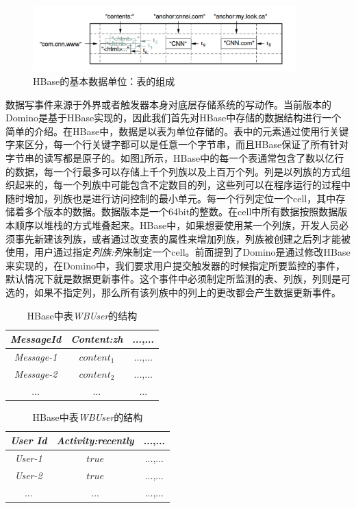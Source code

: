 \begin{figure}[h!]
\centering
\includegraphics[width=4in]{../figures/bigtable.pdf}
\caption{HBase的基本数据单位：表的组成}
\label{fig:hbase}
\end{figure}

数据写事件来源于外界或者触发器本身对底层存储系统的写动作。当前版本的Domino是基于HBase实现的，因此我们首先对HBase中存储的数据结构进行一个简单的介绍。在HBase\cite{chang2008bigtable}中，数据是以表为单位存储的。表中的元素通过使用行关键字来区分，每一个行关键字都可以是任意一个字节串，而且HBase保证了所有针对字节串的读写都是原子的。如图\ref{fig:hbase}所示，HBase中的每一个表通常包含了数以亿行的数据，每一个行最多可以存储上千个列族以及上百万个列。列是以列族的方式组织起来的，每一个列族中可能包含不定数目的列，这些列可以在程序运行的过程中随时增加，列族也是进行访问控制的最小单元。每一个行列定位一个cell，其中存储着多个版本的数据。数据版本是一个64bit的整数。在cell中所有数据按照数据版本顺序以堆栈的方式堆叠起来。HBase中，如果想要使用某一个列族，开发人员必须事先新建该列族，或者通过改变表的属性来增加列族，列族被创建之后列才能被使用，用户通过指定\textit{列族:列}来制定一个cell。前面提到了Domino是通过修改HBase来实现的，在Domino中，我们要求用户提交触发器的时候指定所要监控的事件，默认情况下就是数据更新事件。这个事件中必须制定所监测的表、列族，列则是可选的，如果不指定列，那么所有该列族中的列上的更改都会产生数据更新事件。



\begin{table}[hb]\small
	\begin{minipage}[t]{0.5\linewidth}
	\centering
	\caption{HBase中表\textit{WBContent}的结构}
	\label{table:wbcontent}
	\begin{tabular}{|c|c|c|}
		\hline
		\textit{MessageId} & \textit{Content:zh} & ...,... \\
		\hline
		\textit{Message-1} & $content_{1}$ & ...,... \\
		\hline
		\textit{Message-2} & $content_{2}$ & ...,... \\
		\hline
		... & ... & ...\\
		\hline
	\end{tabular}
	\end{minipage}
	\begin{minipage}[t]{0.5\linewidth}
	\caption{HBase中表\textit{WBUser}的结构}
	\label{table:wbuser}
	\centering
		\begin{tabular}{|c|c|c|}
			\hline
			\textit{User Id} & \textit{Activity:recently} & ...,... \\
			\hline
			\textit{User-1} & $true$ & ...,... \\
			\hline
			\textit{User-2} & $true$ & ...,... \\
			\hline
			... & ... & ...,...\\
			\hline
		\end{tabular}
	\end{minipage}
\end{table}


